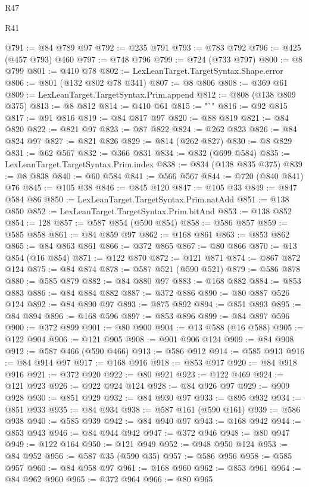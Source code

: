 \begin{lexlean}{R47}
\begin{lexlean}{R41}
\begin{coremodule}
{{{{{{{{{{{{{{{{{{{{{{{{{{{{{{{{{{{{{{{{{{{{{{{{{{{{{{{{{{{{{{{{{{{{{{{{{{{{{{{{{{{{{{{@791 := @84 @789 @97
@792 := @235 @791
@793 := @783 @792
@796 := @425 (@457 @793) @460
@797 := @748 @796
@799 := @724 (@733 @797)
@800 := @8 @799
@801 := @410 @78
@802 := LexLeanTarget.TargetSyntax.Shape.error
@806 := @801 (@132 @802 @78 @341)
@807 := @8 @806
@808 := @369 @61
@809 := LexLeanTarget.TargetSyntax.Prim.append
@812 := @808 (@138 @809 @375)
@813 := @8 @812
@814 := @410 @61
@815 := "`"
@816 := @92 @815
@817 := @91 @816
@819 := @84 @817 @97
@820 := @88 @819
@821 := @84 @820
@822 := @821 @97
@823 := @87 @822
@824 := @262 @823
@826 := @84 @824 @97
@827 := @821 @826
@829 := @814 (@262 @827)
@830 := @8 @829
@831 := @62 @567
@832 := @366 @831
@834 := @832 (@699 @584)
@835 := LexLeanTarget.TargetSyntax.Prim.index
@838 := @834 (@138 @835 @375)
@839 := @8 @838
@840 := @60 @584
@841 := @566 @567
@844 := @720 (@840 @841) @76
@845 := @105 @38
@846 := @845 @120
@847 := @105 @33
@849 := @847 @584 @86
@850 := LexLeanTarget.TargetSyntax.Prim.natAdd
@851 := @138 @850
@852 := LexLeanTarget.TargetSyntax.Prim.bitAnd
@853 := @138 @852
@854 := 128
@857 := @587 @854 (@590 @854)
@858 := @586 @857
@859 := @585 @858
@861 := @84 @859 @97
@862 := @168 @861
@863 := @853 @862
@865 := @84 @863 @861
@866 := @372 @865
@867 := @80 @866
@870 := @13 @854 (@16 @854)
@871 := @122 @870
@872 := @121 @871
@874 := @867 @872 @124
@875 := @84 @874
@878 := @587 @521 (@590 @521)
@879 := @586 @878
@880 := @585 @879
@882 := @84 @880 @97
@883 := @168 @882
@884 := @853 @883
@886 := @84 @884 @882
@887 := @372 @886
@890 := @80 @887 @526 @124
@892 := @84 @890 @97
@893 := @875 @892
@894 := @851 @893
@895 := @84 @894
@896 := @168 @596
@897 := @853 @896
@899 := @84 @897 @596
@900 := @372 @899
@901 := @80 @900
@904 := @13 @588 (@16 @588)
@905 := @122 @904
@906 := @121 @905
@908 := @901 @906 @124
@909 := @84 @908
@912 := @587 @466 (@590 @466)
@913 := @586 @912
@914 := @585 @913
@916 := @84 @914 @97
@917 := @168 @916
@918 := @853 @917
@920 := @84 @918 @916
@921 := @372 @920
@922 := @80 @921
@923 := @122 @469
@924 := @121 @923
@926 := @922 @924 @124
@928 := @84 @926 @97
@929 := @909 @928
@930 := @851 @929
@932 := @84 @930 @97
@933 := @895 @932
@934 := @851 @933
@935 := @84 @934
@938 := @587 @161 (@590 @161)
@939 := @586 @938
@940 := @585 @939
@942 := @84 @940 @97
@943 := @168 @942
@944 := @853 @943
@946 := @84 @944 @942
@947 := @372 @946
@948 := @80 @947
@949 := @122 @164
@950 := @121 @949
@952 := @948 @950 @124
@953 := @84 @952
@956 := @587 @35 (@590 @35)
@957 := @586 @956
@958 := @585 @957
@960 := @84 @958 @97
@961 := @168 @960
@962 := @853 @961
@964 := @84 @962 @960
@965 := @372 @964
@966 := @80 @965
}}}}}}}}}}}}}}}}}}}}}}}}}}}}}}}}}}}}}}}}}}}}}}}}}}}}}}}}}}}}}}}}}}}}}}}}}}}}}}}}}}}}}}}
\end{coremodule}
\end{lexlean}
\end{lexlean}
